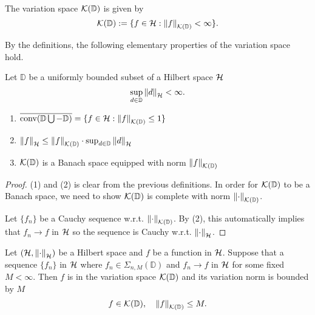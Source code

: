 \begin{definition}
    The variation space $\mathcal{K}({\mathbb{D}})$ is given by
    \begin{equation}
        \mathcal{K}({\mathbb{D}}) := \{ 
            f \in \mathcal{H}: \left\| {f} \right\|_{\mathcal{K}({\mathbb{D}})} < \infty
        \}.
    \end{equation}
\end{definition}

By the definitions, the following elementary properties of the variation space
hold.
\begin{proposition}
    \label{prop:spaceVar_properties}
    Let $\mathbb{D}$ be a uniformly bounded subset of a Hilbert space $\mathcal{H}$
    \begin{equation}
        \sup_{d\in\mathbb{D}} \left\| d \right\|_{\mathcal{H}} < \infty.
    \end{equation}
    \begin{enumerate}
        \item $\overline{\textnormal{conv}(\mathbb{D} \bigcup - \mathbb{D})} = \{
            f\in\mathcal{H}: \left\| {f} \right\|_{\mathcal{K}({\mathbb{D}})} \leq 1
        \}$
        \item $\left\| f \right\|_{\mathcal{H}} \leq \left\| {f} \right\|_{\mathcal{K}({\mathbb{D}})} \cdot
        \sup_{d\in\mathbb{D}} \left\| d \right\|_{\mathcal{H}}$
        \item $\mathcal{K}({\mathbb{D}})$ is a Banach space equipped with norm
        $\left\| {f} \right\|_{\mathcal{K}({\mathbb{D}})}$
    \end{enumerate}
\end{proposition}

\begin{proof}
    (1) and (2) is clear from the previous definitions. In order for
    $\mathcal{K}({\mathbb{D}})$ to be a Banach space, we need to show
    $\mathcal{K}({\mathbb{D}})$ is complete with norm $\left\| {\cdot} \right\|_{\mathcal{K}({\mathbb{D}})}$.

    Let $\{f_n\}$ be a Cauchy sequence w.r.t. $\left\| {\cdot} \right\|_{\mathcal{K}({\mathbb{D}})}$. By
    (2), this automatically implies that $f_n \to f$ in $\mathcal{H}$ so the
    sequence is Cauchy w.r.t. $\left\| \cdot \right\|_{\mathcal{H}}$.
\end{proof}



\begin{proposition}

    Let $(\mathcal{H}, \left\| \cdot \right\|_{\mathcal{H}})$ be a Hilbert space and $f$ be a
    function in $\mathcal{H}$. Suppose that a sequence $\{f_n\}$ in $\mathcal{H}$
    where $f_n \in \Sigma_{n,M}(\mathbb{D})$ \TODO and $f_n \to f$ in $\mathcal{H}$
    for some fixed $M < \infty$. Then $f$ is in the variation space
    $\mathcal{K}({\mathbb{D}})$ and its variation norm is bounded by $M$
    \begin{equation}
        f \in \mathcal{K}({\mathbb{D}}), \quad \left\| {f} \right\|_{\mathcal{K}({\mathbb{D}})}\leq M.
    \end{equation}
\end{proposition}

